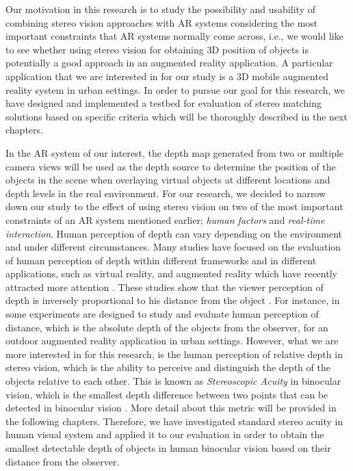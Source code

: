 \documentclass[dvips,letterpaper,12pt]{report}
\begin{document}
Our motivation in this research is to study the possibility and usability of combining stereo vision approaches with AR systems considering the most important constraints that AR systems
normally come across, i.e., we would like to see whether using stereo vision
for obtaining 3D position of objects is potentially a good approach in an augmented reality application. A particular application that we are interested in for
our study is a 3D mobile augmented reality system in urban settings. In order to pursue our goal for this research, we have designed and implemented a testbed for evaluation of
stereo matching solutions based on specific criteria which will be thoroughly described in the next chapters.

In the AR system of our interest, the depth map generated from two or multiple camera views will be used as the depth source to determine the position of the objects in the scene when
overlaying virtual objects at different locations and depth levels in the real environment. For our research, we decided to narrow down our study to the effect of using stereo vision
on two of the most important constraints of an AR system mentioned earlier; {\it human factors} and {\it real-time interaction}. {\newline}
Human perception of depth can vary depending on the environment and under different circumstances. Many studies have focused on the evaluation of human perception of depth within different frameworks
and in different applications, such as virtual reality, and augmented reality which have recently attracted more attention \cite{wann95,dras96,liv05,jer05,swa07,kru10}.
These studies show that the viewer perception of depth
is inversely proportional to his distance from the object \cite{kru10,swa07,jer05,liv05}. For instance, in \cite{swa07} some experiments are designed to study and evaluate human
perception of distance, which is the absolute depth of the objects from the observer, for an outdoor augmented reality application in urban settings. 
However, what we are more interested in for this research, is the human perception of relative depth in stereo vision, which is the ability to perceive and distinguish 
the depth of the objects relative to each other. This is known as {\it Stereoscopic Acuity} in binocular vision, which is the smallest depth difference between two points 
that can be detected in binocular vision \cite{pfa2000}. More detail about
this metric will be provided in the following chapters.
Therefore, we have investigated standard stereo acuity in human visual system and applied it to our evaluation in order to obtain the smallest detectable depth of 
objects in human binocular vision based on their distance from the observer.
\end{document}

